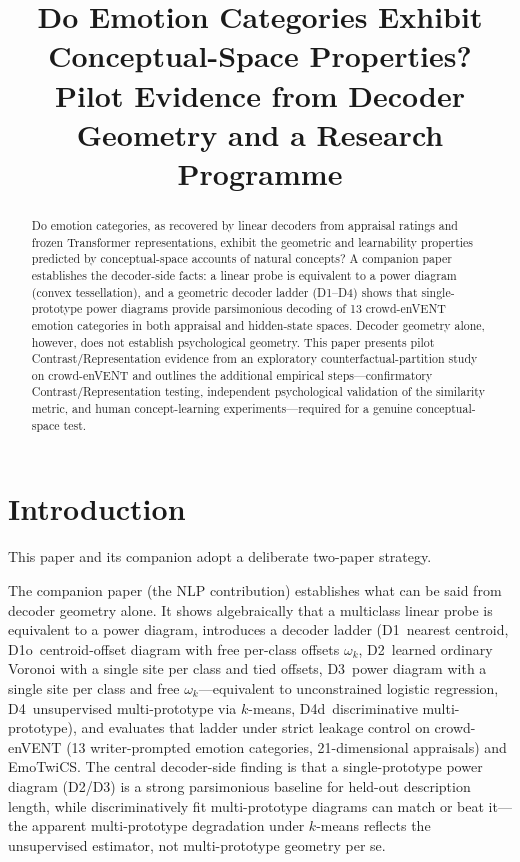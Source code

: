 \documentclass[11pt]{article}
\title{Do Emotion Categories Exhibit Conceptual-Space Properties?\\[6pt]{\large Pilot Evidence from Decoder Geometry and a Research Programme}}
\author{}
\date{}
\begin{document}
\maketitle

\begin{abstract}
Do emotion categories, as recovered by linear decoders from appraisal ratings and frozen Transformer representations, exhibit the geometric and learnability properties predicted by conceptual-space accounts of natural concepts? A companion paper establishes the decoder-side facts: a linear probe is equivalent to a power diagram (convex tessellation), and a geometric decoder ladder (D1--D4) shows that single-prototype power diagrams provide parsimonious decoding of 13 crowd-enVENT emotion categories in both appraisal and hidden-state spaces. Decoder geometry alone, however, does not establish psychological geometry. This paper presents pilot Contrast/Representation evidence from an exploratory counterfactual-partition study on crowd-enVENT and outlines the additional empirical steps---confirmatory Contrast/Representation testing, independent psychological validation of the similarity metric, and human concept-learning experiments---required for a genuine conceptual-space test.
\end{abstract}

\section{Introduction}
\label{sec:intro}

This paper and its companion adopt a deliberate two-paper strategy.

The companion paper (the NLP contribution) establishes what can be said from decoder geometry alone. It shows algebraically that a multiclass linear probe is equivalent to a power diagram, introduces a decoder ladder (D1~nearest centroid, D1o~centroid-offset diagram with free per-class offsets $\omega_k$, D2~learned ordinary Voronoi with a single site per class and tied offsets, D3~power diagram with a single site per class and free $\omega_k$---equivalent to unconstrained logistic regression, D4~unsupervised multi-prototype via $k$-means, D4d~discriminative multi-prototype), and evaluates that ladder under strict leakage control on crowd-enVENT (13 writer-prompted emotion categories, 21-dimensional appraisals) and EmoTwiCS. The central decoder-side finding is that a single-prototype power diagram (D2/D3) is a strong parsimonious baseline for held-out description length, while discriminatively fit multi-prototype diagrams can match or beat it---the apparent multi-prototype degradation under $k$-means reflects the unsupervised estimator, not multi-prototype geometry per se.
\end{document}
